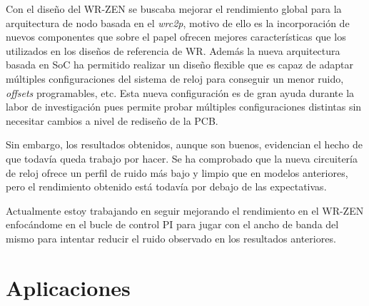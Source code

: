 Con el diseño del WR-ZEN se buscaba mejorar el rendimiento global para la 
arquitectura de nodo basada en el \textit{wrc2p}, motivo de ello es la 
incorporación de nuevos componentes que sobre el papel ofrecen mejores 
características que los utilizados en los diseños de referencia de WR. Además 
la nueva arquitectura basada en SoC ha permitido realizar un diseño flexible 
que es capaz de adaptar múltiples configuraciones del sistema de reloj para 
conseguir un menor ruido, \textit{offsets} programables, etc. Esta nueva 
configuración es de gran ayuda durante la labor de investigación pues permite 
probar múltiples configuraciones distintas sin necesitar cambios a nivel de 
rediseño de la PCB. 

Sin 
embargo, los resultados obtenidos, aunque son buenos, evidencian el hecho de 
que todavía queda trabajo por hacer. Se ha comprobado que la nueva circuitería 
de reloj ofrece un perfil de ruido más bajo y limpio que en modelos anteriores, 
pero el rendimiento obtenido está todavía por debajo de las expectativas.

Actualmente estoy trabajando en seguir mejorando el rendimiento en el WR-ZEN 
enfocándome en el bucle de control PI para jugar con el ancho de banda del 
mismo para intentar reducir el ruido observado en los resultados anteriores.

\section{Aplicaciones}

